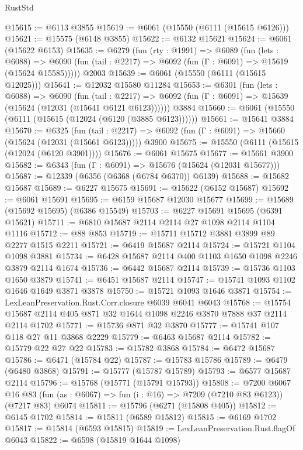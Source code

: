 \begin{lexlean}{RustStd}
\begin{coremodule}
{\begin{coremodule}
{{{{{{{{{{{{{{{{{{{{{{{{{{@15615 := @6113 @3855
@15619 := @6061 (@15550 (@6111 (@15615 @6126)))
@15621 := @15575 (@6148 @3855)
@15622 := @6132 @15621
@15624 := @6061 (@15622 @6153)
@15635 := @6279
    (fun (rty : @1991) =>
    @6089
      (fun (lets : @6088) =>
      @6090 (fun (tail : @2217) => @6092 (fun (Γ : @6091) => @15619 (@15624 @15585)))))
    @2003
@15639 := @6061 (@15550 (@6111 (@15615 @12025)))
@15641 := @12032 @15580 @11284
@15653 := @6301
    (fun (lets : @6088) =>
    @6090
      (fun (tail : @2217) =>
      @6092 (fun (Γ : @6091) => @15639 (@15624 (@12031 (@15641 @6121 @6123))))))
    @3884
@15660 := @6061 (@15550 (@6111 (@15615 (@12024 (@6120 (@3885 @6123))))))
@15661 := @15641 @3884
@15670 := @6325
    (fun (tail : @2217) => @6092 (fun (Γ : @6091) => @15660 (@15624 (@12031 (@15661 @6123)))))
    @3900
@15675 := @15550 (@6111 (@15615 (@12024 (@6120 @3901))))
@15676 := @6061 @15675
@15677 := @15661 @3900
@15682 := @6343 (fun (Γ : @6091) => @15676 (@15624 (@12031 @15677)))
@15687 := @12339 (@6356 (@6368 (@6784 @6370)) @6139)
@15688 := @15682 @15687
@15689 := @6227 @15675
@15691 := @15622 (@6152 @15687)
@15692 := @6061 @15691
@15695 := @6159 @15687 @12030 @15677
@15699 := @15689 (@15692 @15695) (@6386 @15549)
@15703 := @6227 @15691 @15695 (@6391 @15621)
@15711 := @6810 @15687 @2114 @2114 @27 @1098 @2114 @1104 @1116
@15712 := @88 @853
@15719 := @15711 @15712 @3881 @3899 @89 @2277 @1515 @2211
@15721 := @6419 @15687 @2114
@15724 := @15721 @1104 @1098 @3881
@15734 := @6428 @15687 @2114 @400 @1103 @1650 @1098 @2246 @3879 @2114 @1674
@15736 := @6442 @15687 @2114
@15739 := @15736 @1103 @1650 @3879
@15741 := @6451 @15687 @2114
@15747 := @15741 @1093 @1102 @1646 @1649 @3871 @3878
@15750 := @15721 @1093 @1646 @3871
@15754 := LexLeanPreservation.Rust.Corr.closure @6039 @6041 @6043
@15768 := @15754 @15687 @2114 @405 @871 @32 @1644 @1098 @2246 @3870 @7888 @37 @2114 @2114 @1702
@15771 := @15736 @871 @32 @3870
@15777 := @15741 @107 @118 @27 @11 @3868 @2229
@15779 := @6463 @15687 @2114
@15782 := @15779 @22 @27 @22
@15783 := @15782 @3868
@15784 := @6472 @15687
@15786 := @6471 (@15784 @22)
@15787 := @15783 @15786
@15789 := @6479 (@6480 @3868)
@15791 := @15777 (@15787 @15789)
@15793 := @6577 @15687 @2114
@15796 := @15768 (@15771 (@15791 @15793))
@15808 := @7200
    @6067
    @16
    @83
    (fun (as : @6067) => fun (i : @16) => @7209 (@7210 @83 @6123))
    (@7217 @83)
    @6074
@15811 := @15796 (@6271 (@15808 @405))
@15812 := @6145 @1702
@15814 := @15811 (@6589 @15812)
@15815 := @6169 @1702
@15817 := @15814 (@6593 @15815)
@15819 := LexLeanPreservation.Rust.flagOf @6043
@15822 := @6598 (@15819 @1644 @1098)
}}}}}}}}}}}}}}}}}}}}}}}}}}
\end{coremodule}}
\end{coremodule}
\end{lexlean}
